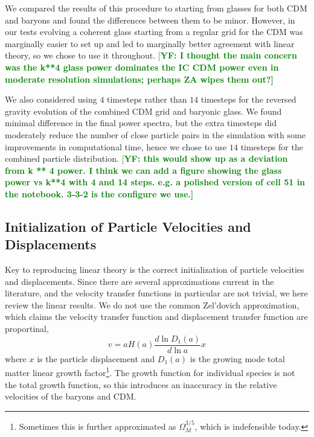 \documentclass[a4paper,11pt]{article}
\newcommand{\spb}[1]{\textcolor{red}{[\bf SPB: #1]} }
\newcommand{\YF}[1]{\textcolor{green}{[\bf YF: #1]} }
\begin{document}
We compared the results of this procedure to starting from glasses for both CDM and baryons and found the differences between them to be minor. However, in our tests evolving a coherent glass starting from a regular grid for the CDM was marginally easier to set up and led to marginally better agreement with linear theory, so we chose to use it throughout. \YF{I thought the main concern was the k**4 glass power dominates the IC CDM power even in moderate resolution simulations; perhaps ZA wipes them out?}

We also considered using $4$ timesteps rather than $14$ timesteps for the reversed gravity evolution of the combined CDM grid and baryonic glass. We found minimal difference in the final power spectra, but the extra timesteps did moderately reduce the number of close particle pairs in the simulation with some improvements in computational time, hence we chose to use $14$ timesteps for the combined particle distribution. \YF{this would show up as a deviation from k ** 4 power. I think we can add a figure showing the glass power vs k**4 with 4 and 14 steps. e.g. a polished version of cell 51 in the notebook. 3-3-2 is the configure we use.}

\subsection{Initialization of Particle Velocities and Displacements}

Key to reproducing linear theory is the correct initialization of particle velocities and displacements. Since there are several approximations current in the literature, and the velocity transfer functions in particular are not trivial, we here review the linear results. We do not use the common Zel'dovich approximation, which claims the velocity transfer function and displacement transfer function are proportinal,
\begin{equation}
 v = a H(a) \frac{d \ln D_1(a)}{d \ln a} x
\end{equation}
where $x$ is the particle displacement and $D_1(a)$ is the growing mode total matter linear growth factor\footnote{Sometimes this is further approximated as $\Omega_M^{3/5}$, which is indefensible today.}. The growth function for individual species is not the total growth function, so this introduces an inaccuracy in the relative velocities of the baryons and CDM.
\end{document}
